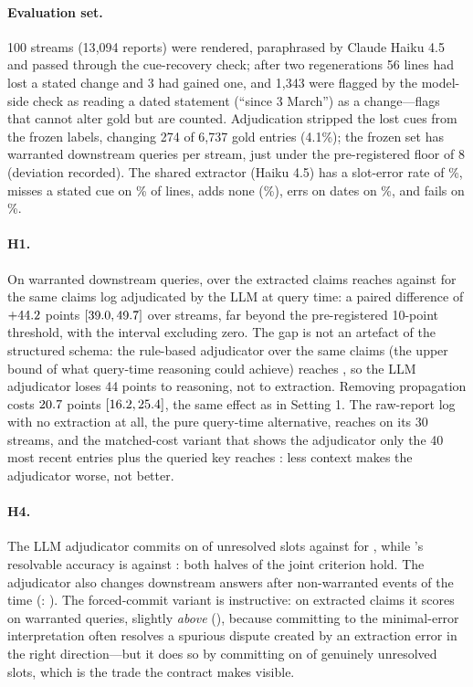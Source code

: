 \paragraph{Evaluation set.} 100 streams (13{,}094 reports) were rendered, paraphrased by Claude Haiku 4.5 and passed through the cue-recovery check; after two regenerations 56 lines had lost a stated change and 3 had gained one, and 1{,}343 were flagged by the model-side check as reading a dated statement (``since 3 March'') as a change---flags that cannot alter gold but are counted. Adjudication stripped the lost cues from the frozen labels, changing 274 of 6{,}737 gold entries (4.1\%); the frozen set has \sTwoWarrPerStream{} warranted downstream queries per stream, just under the pre-registered floor of 8 (deviation recorded). The shared extractor (Haiku 4.5) has a slot-error rate of \sTwoExtSlot\%, misses a stated cue on \sTwoExtMissed\% of lines, adds none (\sTwoExtSpur\%), errs on dates on \sTwoExtValid\%, and fails on \sTwoExtFail\%.

\paragraph{H1.} On warranted downstream queries, \pal{} over the extracted claims reaches \sTwoPalWarr{} against \sTwoLogWarr{} for the same claims log adjudicated by the LLM at query time: a paired difference of $+44.2$ points $[39.0, 49.7]$ over \sTwoHOneN{} streams, far beyond the pre-registered 10-point threshold, with the interval excluding zero. The gap is not an artefact of the structured schema: the rule-based adjudicator over the same claims (the upper bound of what query-time reasoning could achieve) reaches \sTwoRuleWarr{}, so the LLM adjudicator loses 44 points to reasoning, not to extraction. Removing propagation costs $20.7$ points $[16.2, 25.4]$, the same effect as in Setting 1. The raw-report log with no extraction at all, the pure query-time alternative, reaches \sTwoNlWarr{} on its 30 streams, and the matched-cost variant that shows the adjudicator only the 40 most recent entries plus the queried key reaches \sTwoTopkWarr{}: less context makes the adjudicator worse, not better.

\paragraph{H4.} The LLM adjudicator commits on \sTwoLogCommit{} of unresolved slots against \sTwoPalCommit{} for \pal, while \pal's resolvable accuracy is \sTwoPalRes{} against \sTwoLogRes: both halves of the joint criterion hold. The adjudicator also changes downstream answers after non-warranted events \sTwoLogUnsup{} of the time (\pal: \sTwoPalUnsup). The forced-commit variant is instructive: on extracted claims it scores \sTwoCommitWarr{} on warranted queries, slightly \emph{above} \pal{} (\sTwoPalWarr), because committing to the minimal-error interpretation often resolves a spurious dispute created by an extraction error in the right direction---but it does so by committing on \sTwoCommitCommit{} of genuinely unresolved slots, which is the trade the contract makes visible.

